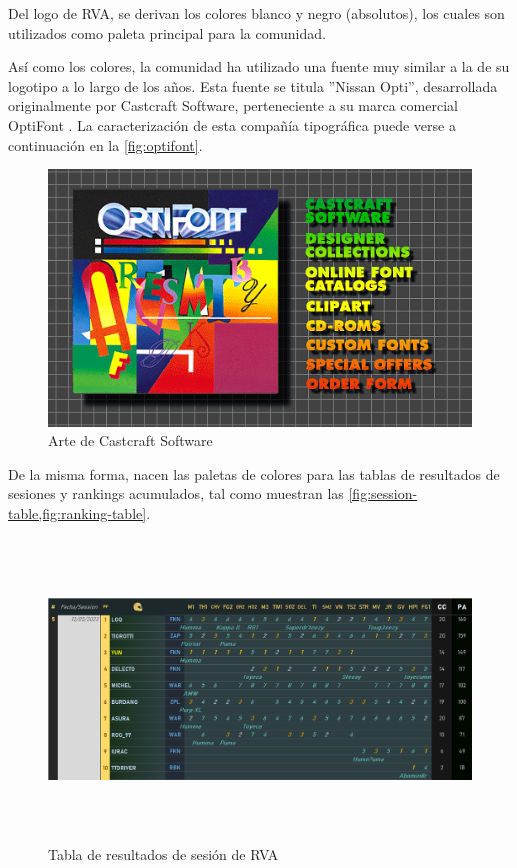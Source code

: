 Del logo de RVA, se derivan los colores blanco y negro (absolutos), los cuales son utilizados como paleta principal para la comunidad.

Así como los colores, la comunidad ha utilizado una fuente muy similar a la de su logotipo a lo largo de los años. Esta fuente se titula ''Nissan Opti'', desarrollada originalmente por Castcraft Software, perteneciente a su marca comercial OptiFont \cite{optifont}. La caracterización de esta compañía tipográfica puede verse a continuación en la \autoref{fig:optifont}.

\begin{figure}[H]
  \begin{center}
    \includegraphics{img/optifont.png} 
  \end{center}
  \caption[Arte de Castcraft Software]{Arte de Castcraft Software}
  \label{fig:optifont}
\end{figure}

De la misma forma, nacen las paletas de colores para las tablas de resultados de sesiones y rankings acumulados, tal como muestran las \cref{fig:session-table,fig:ranking-table}.

\begin{figure}[H]
  \begin{center}
    \includegraphics[width=16cm, height=8cm]{img/session_table.png} 
  \end{center}
  \caption[Tabla de resultados de sesión de RVA]{Tabla de resultados de sesión de RVA}
  \label{fig:session-table}
\end{figure}

